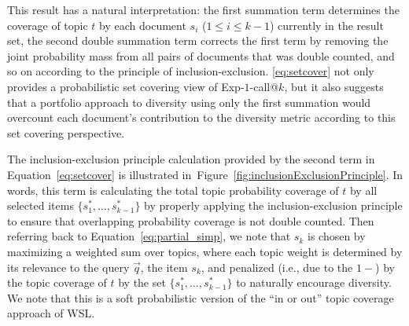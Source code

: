 This result has a natural interpretation: the first summation term
determines the coverage of topic $t$ by each document $s_i$ ($1 \leq i
\leq k-1$) currently in the result set, the second double summation
term corrects the first term by removing the joint probability mass
from all pairs of documents that was double counted, and so on
according to the principle of inclusion-exclusion.
\eqref{eq:setcover} not only provides a probabilistic set covering
view of Exp-$1$-call@$k$, but it also suggests that a portfolio
approach to diversity using only the first summation would overcount
each document's contribution to the diversity metric according to this
set covering perspective.

The inclusion-exclusion principle calculation provided by the second term in Equation~\ref{eq:setcover}
is illustrated in~Figure~\ref{fig:inclusionExclusionPrinciple}. In words, this term is calculating the total topic probability coverage of $t$ by all
selected items $\{ s_1^*,\ldots,s_{k-1}^* \}$ by properly applying the
inclusion-exclusion principle to ensure that overlapping probability coverage
is not double counted. Then referring back to Equation~\ref{eq:partial_simp}, we note that $s_k$ is chosen by maximizing a weighted
sum over topics, where each topic weight is determined by its relevance
to the query $\vec{q}$, the item $s_k$, and penalized (i.e., due to the $1 - $)
by the topic coverage of $t$ by the set $\{ s_1^*,\ldots,s_{k-1}^* \}$ to
naturally encourage diversity.  We note that this is a soft probabilistic
version of the ``in or out'' topic coverage approach of WSL.

